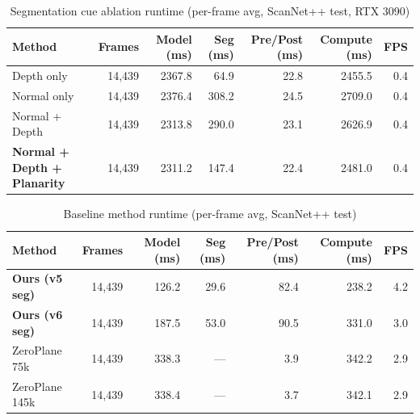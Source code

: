 \documentclass[10pt]{article}
\begin{document}
\begin{table}[t]
  \centering
  \caption{Segmentation cue ablation runtime (per-frame avg, ScanNet++ test, RTX 3090)}
  \label{tab:ablation_runtime}
  \begin{tabular}{l r r r r r r}
    \toprule
    Method & Frames & Model (ms) & Seg (ms) & Pre/Post (ms) & Compute (ms) & FPS \\
    \midrule
    Depth only & 14,439 & 2367.8 & 64.9 & 22.8 & 2455.5 & 0.4 \\
    Normal only & 14,439 & 2376.4 & 308.2 & 24.5 & 2709.0 & 0.4 \\
    Normal + Depth & 14,439 & 2313.8 & 290.0 & 23.1 & 2626.9 & 0.4 \\
    \textbf{Normal + Depth + Planarity} & 14,439 & 2311.2 & 147.4 & 22.4 & 2481.0 & 0.4 \\
    \bottomrule
  \end{tabular}
\end{table}

\clearpage

\begin{table}[t]
  \centering
  \caption{Baseline method runtime (per-frame avg, ScanNet++ test)}
  \label{tab:baseline_runtime}
  \begin{tabular}{l r r r r r r}
    \toprule
    Method & Frames & Model (ms) & Seg (ms) & Pre/Post (ms) & Compute (ms) & FPS \\
    \midrule
    \textbf{Ours (v5 seg)} & 14,439 & 126.2 & 29.6 & 82.4 & 238.2 & 4.2 \\
    \textbf{Ours (v6 seg)} & 14,439 & 187.5 & 53.0 & 90.5 & 331.0 & 3.0 \\
    ZeroPlane 75k & 14,439 & 338.3 & --- & 3.9 & 342.2 & 2.9 \\
    ZeroPlane 145k & 14,439 & 338.4 & --- & 3.7 & 342.1 & 2.9 \\
    \bottomrule
  \end{tabular}
\end{table}

\clearpage
\end{document}
